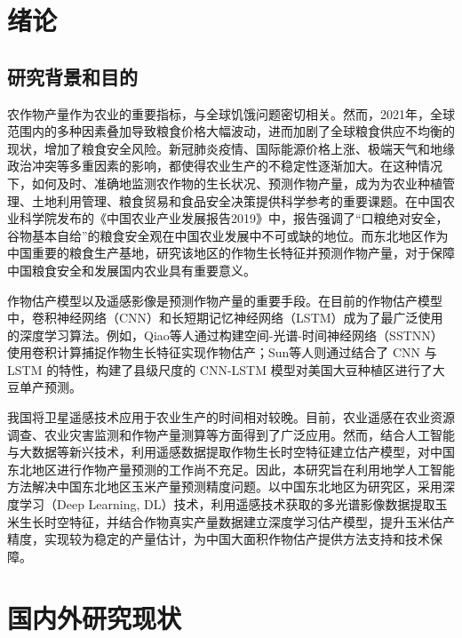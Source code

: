 \cleardoublepage

\section{绪论}

\subsection{研究背景和目的}
\par 农作物产量作为农业的重要指标，与全球饥饿问题密切相关。然而，2021年，全球范围内的多种因素叠加导致粮食价格大幅波动，进而加剧了全球粮食供应不均衡的现状，增加了粮食安全风险。新冠肺炎疫情、国际能源价格上涨、极端天气和地缘政治冲突等多重因素的影响，都使得农业生产的不稳定性逐渐加大。在这种情况下，如何及时、准确地监测农作物的生长状况、预测作物产量，成为为农业种植管理、土地利用管理、粮食贸易和食品安全决策提供科学参考的重要课题。在中国农业科学院发布的《中国农业产业发展报告2019》中，报告强调了“口粮绝对安全，谷物基本自给”的粮食安全观在中国农业发展中不可或缺的地位\cite{中国农业科学院2019中国农业产业发展报告}。而东北地区作为中国重要的粮食生产基地，研究该地区的作物生长特征并预测作物产量，对于保障中国粮食安全和发展国内农业具有重要意义。

\par 作物估产模型以及遥感影像是预测作物产量的重要手段。在目前的作物估产模型中，卷积神经网络（CNN）和长短期记忆神经网络（LSTM）成为了最广泛使用的深度学习算法。例如，Qiao等人通过构建空间-光谱-时间神经网络（SSTNN）使用卷积计算捕捉作物生长特征实现作物估产\cite{qiao2021crop}；Sun等人则通过结合了 CNN 与 LSTM 的特性，构建了县级尺度的 CNN-LSTM 模型对美国大豆种植区进行了大豆单产预测\cite{sun2019county}。

\par 我国将卫星遥感技术应用于农业生产的时间相对较晚\cite{史舟2015农业遥感研究现状与展望}。目前，农业遥感在农业资源调查、农业灾害监测和作物产量测算等方面得到了广泛应用\cite{陈仲新2016农业遥感研究应用进展与展望}。然而，结合人工智能与大数据等新兴技术，利用遥感数据提取作物生长时空特征建立估产模型，对中国东北地区进行作物产量预测的工作尚不充足。因此，本研究旨在利用地学人工智能方法解决中国东北地区玉米产量预测精度问题。以中国东北地区为研究区，采用深度学习（Deep Learning, DL）技术，利用遥感技术获取的多光谱影像数据提取玉米生长时空特征，并结合作物真实产量数据建立深度学习估产模型，提升玉米估产精度，实现较为稳定的产量估计，为中国大面积作物估产提供方法支持和技术保障。

\section{国内外研究现状}

